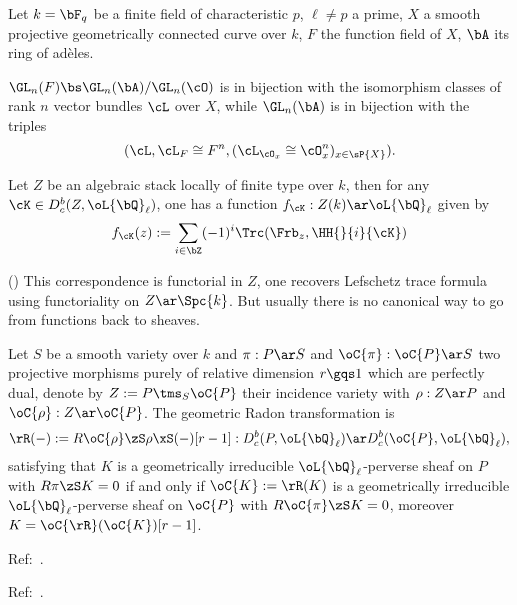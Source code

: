\documentclass[article, a4paper, twoside]{universal}
\begin{document}
\confighead{}{}{}


\begin{stp}
	Let $k=\bF_{q}$ be a finite field of characteristic $p$, $\ell\neq p$ a prime, $X$ a smooth projective geometrically connected curve over $k$, $F$ the function field of $X$, $\bA$ its ring of ad{\`e}les.
\end{stp}


$\GL_{n}(F)\bs\GL_{n}(\bA)/\GL_{n}(\cO)$ is in bijection with the isomorphism classes of rank $n$ vector bundles $\cL$ over $X$, while $\GL_{n}(\bA)$ is in bijection with the triples
\[
	(\cL, \cL_{F}\cong F^{n}, (\cL_{\cO_{x}}\cong\cO_{x}^{n})_{x\in\sP{X}}).
\]

Let $Z$ be an algebraic stack locally of finite type over $k$, then for any $\cK\in D_{c}^{b}(Z,\oL{\bQ}_{\ell})$, one has a function $f_{\cK}:Z(k)\ar\oL{\bQ}_{\ell}$ given by
\[
	f_{\cK}(z):=\sum_{i\in\bZ}(-1)^{i}\Trc(\Frb_{z},\HH{}{i}{\cK})
\]

\begin{rmk}
	(\cite[2.5]{Yun2014Rigidity}) This correspondence is functorial in $Z$, one recovers Lefschetz trace formula using functoriality on $Z\ar\Spc{k}$. But usually there is no canonical way to go from functions back to sheaves.
\end{rmk}

Let $S$ be a smooth variety over $k$ and $\pi:P\ar S$ and $\oC{\pi}:\oC{P}\ar S$ two projective morphisms purely of relative dimension $r\gqs1$ which are perfectly dual, denote by $Z:=P\tms_{S}\oC{P}$ their incidence variety with $\rho:Z\ar P$ and $\oC{\rho}:Z\ar\oC{P}$. The geometric Radon transformation is
\[
	\rR(-):=R\oC{\rho}\zS\rho\xS(-)[r-1]:D_{c}^{b}(P,\oL{\bQ}_{\ell})\ar D_{c}^{b}(\oC{P},\oL{\bQ}_{\ell}),
\]
satisfying that $K$ is a geometrically irreducible $\oL{\bQ}_{\ell}$-perverse sheaf on $P$ with $R\pi\zS K=0$ if and only if $\oC{K}:=\rR(K)$ is a geometrically irreducible $\oL{\bQ}_{\ell}$-perverse sheaf on $\oC{P}$ with $R\oC{\pi}\zS K=0$, moreover $K=\oC{\rR}(\oC{K})[r-1]$.

Ref:~\cite{Papikian2023}.


Ref:~\cite{LaumonDrinfeld1,LaumonDrinfeld2}.


\printref
\end{document}
